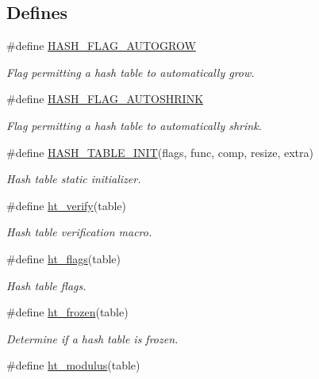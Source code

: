 \subsection*{Defines}
\begin{CompactItemize}
\item 
\#define \hyperlink{group__dbprim__hash_a16}{HASH\_\-FLAG\_\-AUTOGROW}
\begin{CompactList}\small\item\em Flag permitting a hash table to automatically grow. \item\end{CompactList}\item 
\#define \hyperlink{group__dbprim__hash_a17}{HASH\_\-FLAG\_\-AUTOSHRINK}
\begin{CompactList}\small\item\em Flag permitting a hash table to automatically shrink. \item\end{CompactList}\item 
\#define \hyperlink{group__dbprim__hash_a18}{HASH\_\-TABLE\_\-INIT}(flags, func, comp, resize, extra)
\begin{CompactList}\small\item\em Hash table static initializer. \item\end{CompactList}\item 
\#define \hyperlink{group__dbprim__hash_a19}{ht\_\-verify}(table)
\begin{CompactList}\small\item\em Hash table verification macro. \item\end{CompactList}\item 
\#define \hyperlink{group__dbprim__hash_a20}{ht\_\-flags}(table)
\begin{CompactList}\small\item\em Hash table flags. \item\end{CompactList}\item 
\#define \hyperlink{group__dbprim__hash_a21}{ht\_\-frozen}(table)
\begin{CompactList}\small\item\em Determine if a hash table is frozen. \item\end{CompactList}\item 
\#define \hyperlink{group__dbprim__hash_a22}{ht\_\-modulus}(table)

\end{CompactItemize}
